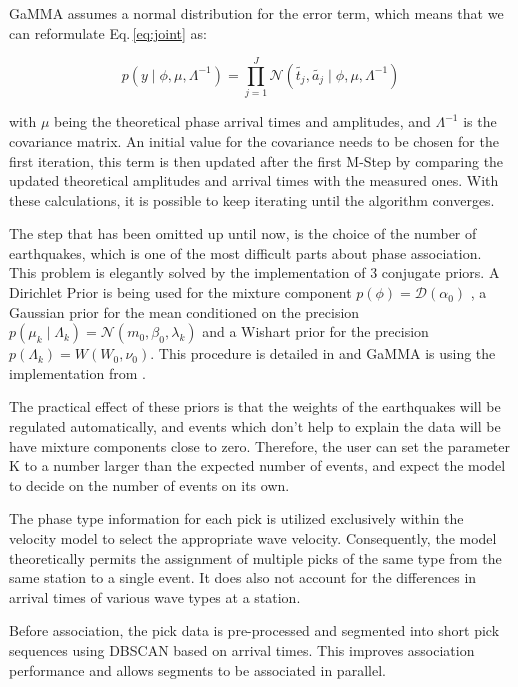 \documentclass{scrreprt}
\begin{document}
GaMMA assumes a normal distribution for the error term, which means that we can reformulate Eq.\,\ref{eq:joint} as:

\begin{equation}
    p(y \mid \phi, \mu, \Lambda^{-1}) = \prod_{j=1}^J \mathcal{N}( \tilde{t_j}, \tilde{a_j}\mid \phi, \mu, \Lambda^{-1})
\end{equation}

with $\mu$ being the theoretical phase arrival times and amplitudes, and $\Lambda^{-1}$ is the covariance matrix. An initial value for the covariance needs to be chosen for the first iteration, this term is then updated after the first M-Step by comparing the updated theoretical amplitudes and arrival times with the measured ones. With these calculations, it is possible to keep iterating until the algorithm converges.

The step that has been omitted up until now, is the choice of the number of earthquakes, which is one of the most difficult parts about phase association. This problem is elegantly solved by the implementation of 3 conjugate priors. A Dirichlet Prior is being used for the mixture component $p(\phi) = \mathcal{D}(\alpha_0)$ \citep{dirichlet}, a Gaussian prior for the mean conditioned on the precision $p(\mu_k \mid \Lambda_k) = \mathcal{N}(m_0, \beta_0, \lambda_k)$ and a Wishart prior for the precision $p(\Lambda_k) = W(W_0, \nu_0)$. This procedure is detailed in \citet{bishop} and GaMMA is using the implementation from \citet{scikit-learn}.

The practical effect of these priors is that the weights of the earthquakes will be regulated automatically, and events which don't help to explain the data will be have mixture components close to zero. Therefore, the user can set the parameter K to a number larger than the expected number of events, and expect the model to decide on the number of events on its own.

The phase type information for each pick is utilized exclusively within the velocity model to select the appropriate wave velocity. Consequently, the model theoretically permits the assignment of multiple picks of the same type from the same station to a single event. It does also not account for the differences in arrival times of various wave types at a station.

Before association, the pick data is pre-processed and segmented into short pick sequences using DBSCAN \citep{dbscan} based on arrival times. This improves association performance and allows segments to be associated in parallel.
\end{document}

